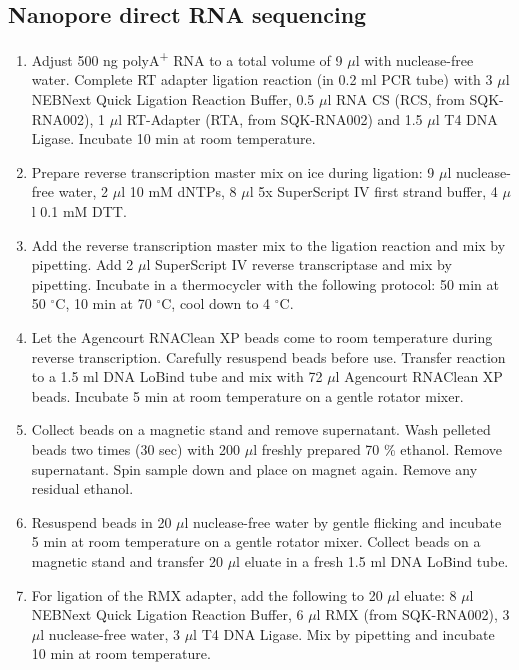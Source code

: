 \documentclass[times, 11pt, a4paper]{article}
\begin{document}
\subsection*{Nanopore direct RNA sequencing}
\begin{enumerate}
\item Adjust 500 ng polyA\textsuperscript{+} RNA to a total volume of 9 $\mu$l with nuclease-free water. Complete RT adapter ligation reaction (in 0.2 ml PCR tube) with 3 $\mu$l NEBNext Quick Ligation Reaction Buffer, 0.5 $\mu$l RNA CS (RCS, from SQK-RNA002), 1 $\mu$l RT-Adapter (RTA, from SQK-RNA002) and 1.5 $\mu$l T4 DNA Ligase. Incubate 10 min at room temperature.

\item Prepare reverse transcription master mix on ice during ligation: 9 $\mu$l nuclease-free water, 2 $\mu$l 10 mM dNTPs, 8 $\mu$l 5x SuperScript IV first strand buffer, 4 $\mu$l 0.1 mM DTT.

\item Add the reverse transcription master mix to the ligation reaction and mix by pipetting. Add 2 $\mu$l SuperScript IV reverse transcriptase and mix by pipetting. Incubate in a thermocycler with the following protocol: 50 min at 50 $^{\circ}$C, 10 min at 70 $^{\circ}$C, cool down to 4 $^{\circ}$C.

\item Let the Agencourt RNAClean XP beads come to room temperature during reverse transcription. Carefully resuspend beads before use. Transfer reaction to a 1.5 ml DNA LoBind tube and mix with 72 $\mu$l Agencourt RNAClean XP beads. Incubate 5 min at room temperature on a gentle rotator mixer.

\item Collect beads on a magnetic stand and remove supernatant. Wash pelleted beads two times (30 sec) with 200 $\mu$l freshly prepared 70 \% ethanol. Remove supernatant. Spin sample down and place on magnet again. Remove any residual ethanol. 

\item Resuspend beads in 20 $\mu$l nuclease-free water by gentle flicking and incubate 5 min at room temperature on a gentle rotator mixer. Collect beads on a magnetic stand and transfer 20 $\mu$l eluate in a fresh 1.5 ml DNA LoBind tube.

\item For ligation of the RMX adapter, add the following to 20 $\mu$l eluate: 8 $\mu$l NEBNext Quick Ligation Reaction Buffer, 6 $\mu$l RMX (from SQK-RNA002), 3 $\mu$l nuclease-free water, 3 $\mu$l T4 DNA Ligase. Mix by pipetting and incubate 10 min at room temperature.


\end{enumerate}
\end{document}
